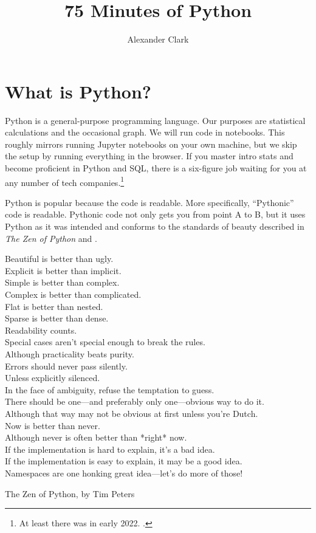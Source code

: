 \documentclass{article}
\author{Alexander Clark\\ \scalebox{0.7}{Columbia University - Stats 1101}}
\title{75 Minutes of Python}
\date{\semester}
\begin{document}
\maketitle


\section{What is Python?}

Python is a general-purpose programming language. Our purposes are statistical calculations and the occasional graph. We will run code in  notebooks. This roughly mirrors running Jupyter notebooks on your own machine, but we skip the setup by running everything in the browser. If you master intro stats and become proficient in Python and SQL, there is a six-figure job waiting for you at any number of tech companies.\footnote{At least there was in early 2022. .} 

Python is popular because the code is readable. More specifically, ``Pythonic'' code is readable. Pythonic code not only gets you from point A to B, but it uses Python as it was intended and conforms to the standards of beauty described in \emph{The Zen of Python} and .

\begin{footnotesize}
\begin{displayquote}
Beautiful is better than ugly.\\
Explicit is better than implicit.\\
Simple is better than complex.\\
Complex is better than complicated.\\
Flat is better than nested.\\
Sparse is better than dense.\\
Readability counts.\\
Special cases aren't special enough to break the rules.\\
Although practicality beats purity.\\
Errors should never pass silently.\\
Unless explicitly silenced.\\
In the face of ambiguity, refuse the temptation to guess.\\
There should be one---and preferably only one---obvious way to do it.\\
Although that way may not be obvious at first unless you're Dutch.\\
Now is better than never.\\
Although never is often better than *right* now.\\
If the implementation is hard to explain, it's a bad idea.\\
If the implementation is easy to explain, it may be a good idea.\\
Namespaces are one honking great idea---let's do more of those!
\end{displayquote}
\hfill The Zen of Python, by Tim Peters
\end{footnotesize}
\end{document}
